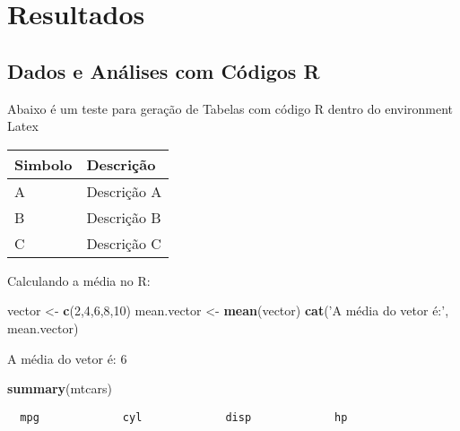 \documentclass[12pt,]{04-class-files/abntex2}
\newenvironment{Shaded}{\begin{snugshade}}{\end{snugshade}}
\newcommand{\DecValTok}[1]{\textcolor[rgb]{0.00,0.00,0.81}{#1}}
\newcommand{\KeywordTok}[1]{\textcolor[rgb]{0.13,0.29,0.53}{\textbf{#1}}}
\newcommand{\NormalTok}[1]{#1}
\newcommand{\StringTok}[1]{\textcolor[rgb]{0.31,0.60,0.02}{#1}}
\begin{document}
\part{Resultados}

\chapter{Dados e Análises com Códigos R}

Abaixo é um teste para geração de Tabelas com código R dentro do environment Latex

\begin{tabular}{l|l}
\hline
Simbolo & Descrição\\
\hline
A & Descrição A\\
\hline
B & Descrição B\\
\hline
C & Descrição C\\
\hline
\end{tabular}

Calculando a média no R:

\begin{Shaded}
\begin{Highlighting}[]
\NormalTok{vector <-}\StringTok{ }\KeywordTok{c}\NormalTok{(}\DecValTok{2}\NormalTok{,}\DecValTok{4}\NormalTok{,}\DecValTok{6}\NormalTok{,}\DecValTok{8}\NormalTok{,}\DecValTok{10}\NormalTok{)}
\NormalTok{mean.vector <-}\StringTok{ }\KeywordTok{mean}\NormalTok{(vector)}
\KeywordTok{cat}\NormalTok{(}\StringTok{'A média do vetor é:'}\NormalTok{, mean.vector)}
\end{Highlighting}
\end{Shaded}

A média do vetor é: 6

\begin{Shaded}
\begin{Highlighting}[]
\KeywordTok{summary}\NormalTok{(mtcars)}
\end{Highlighting}
\end{Shaded}

\begin{verbatim}
  mpg             cyl             disp             hp       
\end{verbatim}
\end{document}
